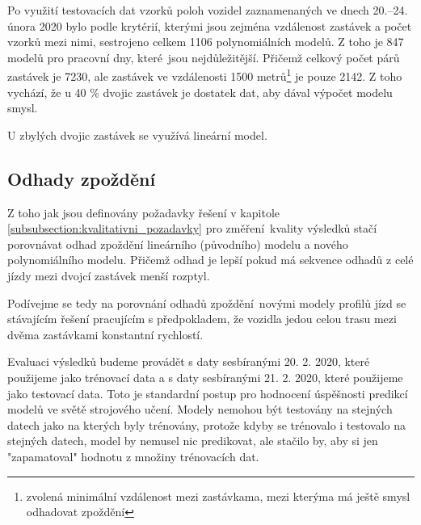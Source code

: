 Po využití testovacích dat vzorků poloh vozidel zaznamenaných ve dnech 20.--24. února 2020 bylo podle krytérií, kterými jsou zejména vzdálenost zastávek a počet vzorků mezi nimi, sestrojeno celkem 1106 polynomiálních modelů. Z toho je 847 modelů pro pracovní dny, které jsou nejdůležitější. Přičemž celkový počet párů zastávek je 7230, ale zastávek ve vzdálenosti 1500 metrů\footnote{zvolená minimální vzdálenost mezi zastávkama, mezi kterýma má ještě smysl odhadovat zpoždění} je pouze 2142. Z toho vychází, že u 40 \% dvojic zastávek je dostatek dat, aby dával výpočet modelu smysl.

\bigbreak

U zbylých dvojic zastávek se využívá lineární model.

\subsection{Odhady zpoždění}

Z toho jak jsou definovány požadavky řešení v kapitole \ref{subsubsection:kvalitativni_pozadavky} pro změření kvality výsledků stačí porovnávat odhad zpoždění lineárního (původního) modelu a nového polynomiálního modelu. Přičemž odhad je lepší pokud má sekvence odhadů  z celé jízdy mezi dvojcí zastávek menší rozptyl.

\bigbreak

Podívejme se tedy na porovnání odhadů zpoždění novými modely profilů jízd se stávajícím řešení pracujícím s předpokladem, že vozidla jedou celou trasu mezi dvěma zastávkami konstantní rychlostí.

\bigbreak

Evaluaci výsledků budeme provádět s daty sesbíranými 20. 2. 2020, které použijeme jako trénovací data a s daty sesbíranými 21. 2. 2020, které použijeme jako testovací data. Toto je standardní postup pro hodnocení úspěšnosti predikcí modelů ve světě strojového učení. Modely nemohou být testovány na stejných datech jako na kterých byly trénovány, protože kdyby se trénovalo i testovalo na stejných datech, model by nemusel nic predikovat, ale stačilo by, aby si jen "zapamatoval" hodnotu z množiny trénovacích dat.

\bigbreak
